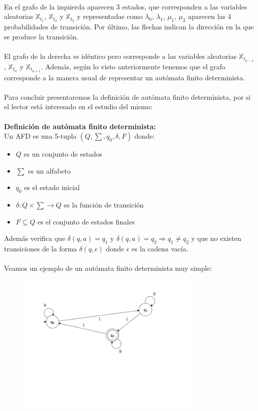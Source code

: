 \documentclass[12pt,a4paper]{article}
\begin{document}
\\
En el grafo de la izquierda aparecen 3 estados, que corresponden a las variables aleatorias $\mathbb{X}_{t_1}$, $\mathbb{X}_{t_2}$ y $\mathbb{X}_{t_3}$ y representadas como $\lambda_0$, $\lambda_1$, $\mu_1$, $\mu_2$ aparecen las 4 probabilidades de transición. Por último, las flechas indican la dirección en la que se produce la transición.
\\\\
El grafo de la derecha es idéntico pero corresponde a las variables aleatorias $\mathbb{X}_{t_{n-1}}$, $\mathbb{X}_{t_n}$ y $\mathbb{X}_{t_{n+1}}$. Además, según lo visto anteriormente tenemos que el grafo corresponde a la manera usual de representar un autómata finito determinista.
\\\\
Para concluir presentaremos la definición de autómata finito determinista, por si el lector está interesado en el estudio del mismo:
\\\\
\textbf{Definición de autómata finito determinista:}
\\
Un AFD es una 5-tupla $(Q,\sum ,q_0,\delta,F)$ donde:
\begin{itemize}
\item $Q$ es un conjunto de estados
\item $\sum$ es un alfabeto
\item $q_0$ es el estado inicial
\item $\delta :Q\times\sum\rightarrow Q$ es la función de transición
\item $F\subseteq Q$ es el conjunto de estados finales
\end{itemize}
Además verifica que $\delta (q,a)=q_1$ y $\delta (q,a)=q_2 \Rightarrow q_1 \neq q_2$ y que no existen transiciones de la forma $\delta(q,\epsilon)$ donde $\epsilon$ es la cadena vacía.
\\\\
Veamos un ejemplo de un autómata finito determinista muy simple:
\begin{figure}[h]
  \centering
    \includegraphics[width=0.8\textwidth]{img/afd.png}
  \label{fig:ejemplo}
\end{figure}
\end{document}
